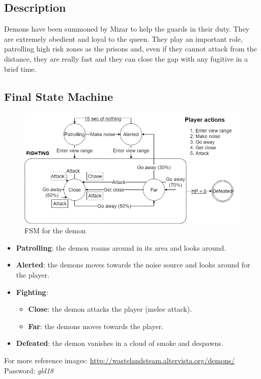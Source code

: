 \subsection{Description}
Demons have been summoned by Mizar to help the guards in their duty. They are extremely obedient and loyal to the queen. They play an important role, patrolling high risk zones as the prisons and, even if they cannot attack from the distance, they are really fast and they can close the gap with any fugitive in a brief time.

\subsection{Final State Machine}
\begin{figure}[H]
  \centering
  \includegraphics[width=\textwidth]{Images/Diagrams/FSMs/demonFSM}
  \caption{FSM for the demon}
\end{figure}

\begin{itemize}
	\item \textbf{Patrolling}: the demon roams around in its area and looks around.
	\item \textbf{Alerted}: the demons moves towards the noise source and looks around for the player.
	\item \textbf{Fighting}:
	\begin{itemize}
		\item \textbf{Close}: the demon attacks the player (melee attack).
		\item \textbf{Far}: the demons moves towards the player.
	\end{itemize}
	\item \textbf{Defeated}: the demon vanishes in a cloud of smoke and despawns.
\end{itemize}

For more reference images: \url{http://wastelandsteam.altervista.org/demons/}\\
Password: \textit{gld18}
